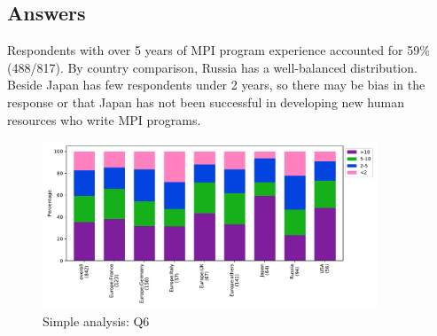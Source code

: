 
\subsection{Answers}


Respondents with over 5 years of MPI program experience 
accounted for 59\% (488/817). By country comparison, 
Russia has a well-balanced distribution. Beside Japan has 
few respondents under 2 years, so there may be bias in the 
response or that Japan has not been successful in 
developing new human resources who write MPI programs.


\begin{figure}[htb]
\begin{center}
\includegraphics[width=10cm]{../pdfs/Q6.pdf}
\caption{Simple analysis: Q6}
\label{fig:Q6}
\end{center}
\end{figure}
